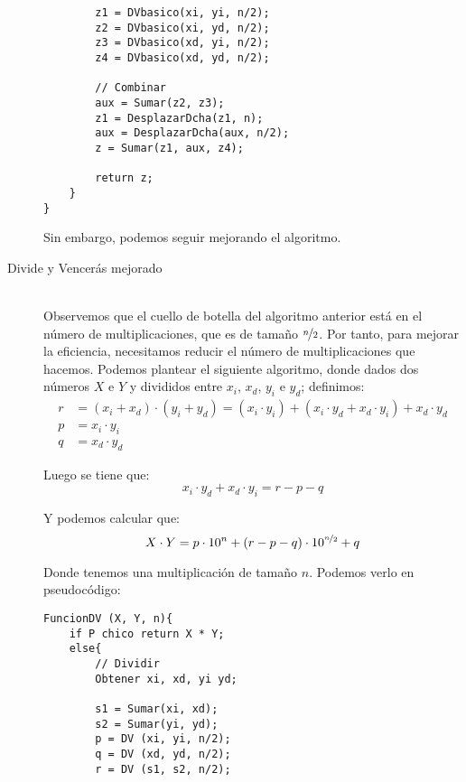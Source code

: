 \begin{description}
\begin{listing}[H]
\begin{verbatim}
        z1 = DVbasico(xi, yi, n/2);
        z2 = DVbasico(xi, yd, n/2);
        z3 = DVbasico(xd, yi, n/2);
        z4 = DVbasico(xd, yd, n/2);

        // Combinar
        aux = Sumar(z2, z3);
        z1 = DesplazarDcha(z1, n);
        aux = DesplazarDcha(aux, n/2);
        z = Sumar(z1, aux, z4);

        return z;
    }
}
            \end{verbatim}
        \end{listing}


    Sin embargo, podemos seguir mejorando el algoritmo.

    \item [Divide y Vencerás mejorado]~\\
        Observemos que el cuello de botella del algoritmo anterior está en el número de multiplicaciones, que es de tamaño $\nicefrac{n}{2}$. Por tanto, para mejorar la eficiencia, necesitamos reducir el número de multiplicaciones que hacemos. Podemos plantear el siguiente algoritmo, donde dados dos números $X$ e $Y$ y divididos entre $x_i$, $x_d$, $y_i$ e $y_d$; definimos:
        \begin{align*}
            r &= (x_i + x_d) \cdot (y_i + y_d) = (x_i \cdot y_i) + (x_i \cdot y_d + x_d \cdot y_i) + x_d \cdot y_d \\
            p &= x_i \cdot y_i \\
            q &= x_d \cdot y_d
        \end{align*}

        Luego se tiene que:
        \begin{equation*}
            x_i \cdot y_d + x_d \cdot y_i = r - p - q
        \end{equation*}
        
        Y podemos calcular que:
        \begin{equation*}
            X \cdot Y = p \cdot 10^n + (r-p-q) \cdot 10^{\nicefrac{n}{2}} + q
        \end{equation*}

        Donde tenemos una multiplicación de tamaño $n$. Podemos verlo en pseudocódigo:
        \begin{listing}[H]
            \begin{verbatim}
FuncionDV (X, Y, n){
    if P chico return X * Y;
    else{
        // Dividir
        Obtener xi, xd, yi yd;

        s1 = Sumar(xi, xd);
        s2 = Sumar(yi, yd);
        p = DV (xi, yi, n/2);
        q = DV (xd, yd, n/2);
        r = DV (s1, s2, n/2);
        

\end{verbatim}
\end{listing}
\end{description}
